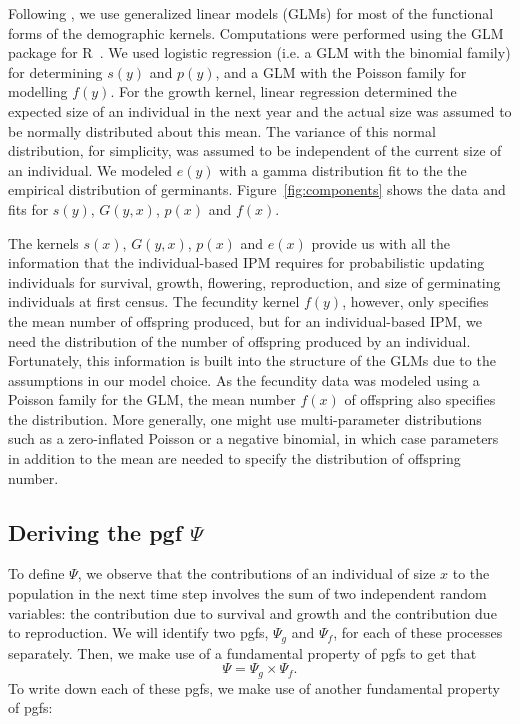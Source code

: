 \documentclass[12pt]{amsart}\usepackage[]{graphicx}\usepackage[]{color}
\begin{document}
Following \citet{salguero-etal-12}, we use generalized linear models (GLMs) for most of the functional forms of the demographic kernels. Computations were performed using the GLM package for R~\citep{R-15}. We used logistic regression (i.e. a GLM with the binomial family) for determining $s(y)$ and $p(y)$, and a GLM with the Poisson family for modelling $f(y)$.  For the growth kernel, linear regression determined the expected size of an individual in the next year and the actual size was assumed to be normally distributed about this mean. The variance of this normal distribution, for simplicity, was assumed to be independent of the current size of an individual. We modeled $e(y)$ with a gamma distribution fit to the the empirical distribution of germinants. Figure~\ref{fig:components} shows the data and fits for $s(y)$, $G(y,x)$, $p(x)$ and $f(x)$.

The kernels $s(x)$, $G(y,x)$, $p(x)$ and $e(x)$ provide us with all the information that the individual-based IPM requires for probabilistic updating individuals for survival, growth, flowering, reproduction, and size of germinating individuals at first census. The fecundity kernel $f(y)$, however, only specifies the mean number of offspring produced, but for an individual-based IPM, we need the distribution of the number of offspring produced by an individual. Fortunately, this information is built into the structure of the GLMs due to the assumptions in our model choice. As the fecundity data was modeled using a Poisson family for the GLM, the mean number $f(x)$ of offspring also specifies the distribution. More generally, one might use multi-parameter distributions such as a zero-inflated Poisson or a negative binomial, in which case parameters in addition to the mean are needed to specify the distribution of offspring number.

\subsection*{Deriving the pgf $\Psi$}

To define $\Psi$, we observe that the contributions of an individual of size $x$ to the population in the next time step involves the sum of two independent random variables:  the contribution due to survival and growth and the contribution due to reproduction. We will identify two pgfs, $\Psi_g$ and $\Psi_f$, for each of these processes separately. Then, we make use of a fundamental property of pgfs\vskip 0.1in
\vskip 0.1in\noindent
to get that
\[
\Psi=\Psi_g \times \Psi_f.
\]
To write down each of these pgfs, we make use of another fundamental property of pgfs:
\vskip 0.1in
\vskip 0.1in
\end{document}
